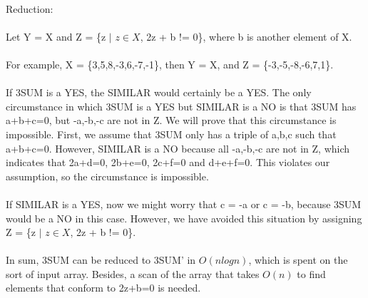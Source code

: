 \begin{problem}{2} ~\\
Reduction:\\
\\
Let Y = X and Z = \{z $|$ $z \in X$, 2z + b != 0\}, where b is another element of X.\\
\\
For example, X = \{3,5,8,-3,6,-7,-1\}, then Y = X, and Z = \{-3,-5,-8,-6,7,1\}.\\
\\
If 3SUM is a YES, the SIMILAR would certainly be a YES. The only circumstance in which 3SUM is a YES but SIMILAR is a NO is that 3SUM has a+b+c=0, but -a,-b,-c are not in Z. We will prove that this circumstance is impossible. First, we assume that 3SUM only has a triple of a,b,c such that a+b+c=0. However, SIMILAR is a NO because all -a,-b,-c are not in Z, which indicates that 2a+d=0, 2b+e=0, 2c+f=0 and d+e+f=0. This violates our assumption, so the circumstance is impossible.\\
\\
If SIMILAR is a YES, now we might worry that c = -a or c = -b, because 3SUM would be a NO in this case. However, we have avoided this situation by assigning Z = \{z $|$ $z \in X$, 2z + b != 0\}.\\
\\
In sum, 3SUM can be reduced to 3SUM' in $O(nlog{}n)$, which is spent on the sort of input array. Besides, a scan of the array that takes $O
(n)$ to find elements that conform to 2z+b=0 is needed.
\end{problem}